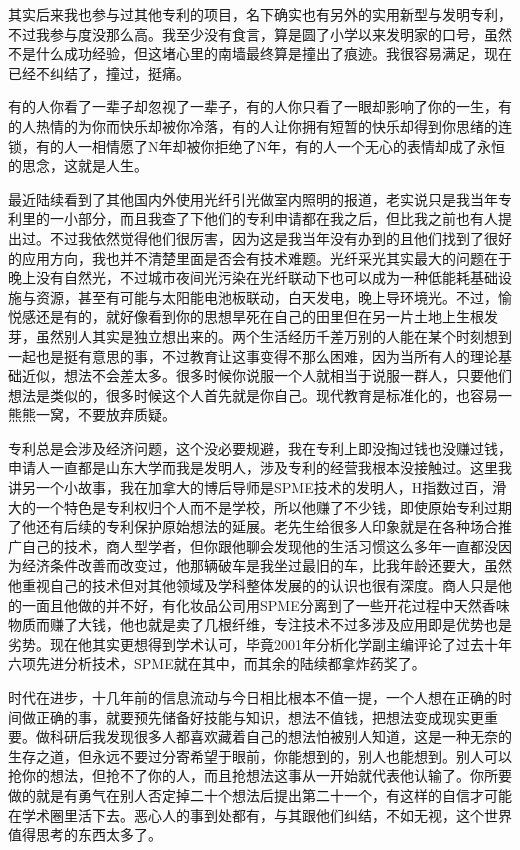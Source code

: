 \documentclass[
]{book}
\begin{document}
其实后来我也参与过其他专利的项目，名下确实也有另外的实用新型与发明专利，不过我参与度没那么高。我至少没有食言，算是圆了小学以来发明家的口号，虽然不是什么成功经验，但这堵心里的南墙最终算是撞出了痕迹。我很容易满足，现在已经不纠结了，撞过，挺痛。

有的人你看了一辈子却忽视了一辈子，有的人你只看了一眼却影响了你的一生，有的人热情的为你而快乐却被你冷落，有的人让你拥有短暂的快乐却得到你思绪的连锁，有的人一相情愿了N年却被你拒绝了N年，有的人一个无心的表情却成了永恒的思念，这就是人生。

最近陆续看到了其他国内外使用光纤引光做室内照明的报道，老实说只是我当年专利里的一小部分，而且我查了下他们的专利申请都在我之后，但比我之前也有人提出过。不过我依然觉得他们很厉害，因为这是我当年没有办到的且他们找到了很好的应用方向，我也并不清楚里面是否会有技术难题。光纤采光其实最大的问题在于晚上没有自然光，不过城市夜间光污染在光纤联动下也可以成为一种低能耗基础设施与资源，甚至有可能与太阳能电池板联动，白天发电，晚上导环境光。不过，愉悦感还是有的，就好像看到你的思想旱死在自己的田里但在另一片土地上生根发芽，虽然别人其实是独立想出来的。两个生活经历千差万别的人能在某个时刻想到一起也是挺有意思的事，不过教育让这事变得不那么困难，因为当所有人的理论基础近似，想法不会差太多。很多时候你说服一个人就相当于说服一群人，只要他们想法是类似的，很多时候这个人首先就是你自己。现代教育是标准化的，也容易一熊熊一窝，不要放弃质疑。

专利总是会涉及经济问题，这个没必要规避，我在专利上即没掏过钱也没赚过钱，申请人一直都是山东大学而我是发明人，涉及专利的经营我根本没接触过。这里我讲另一个小故事，我在加拿大的博后导师是SPME技术的发明人，H指数过百，滑大的一个特色是专利权归个人而不是学校，所以他赚了不少钱，即使原始专利过期了他还有后续的专利保护原始想法的延展。老先生给很多人印象就是在各种场合推广自己的技术，商人型学者，但你跟他聊会发现他的生活习惯这么多年一直都没因为经济条件改善而改变过，他那辆破车是我坐过最旧的车，比我年龄还要大，虽然他重视自己的技术但对其他领域及学科整体发展的的认识也很有深度。商人只是他的一面且他做的并不好，有化妆品公司用SPME分离到了一些开花过程中天然香味物质而赚了大钱，他也就是卖了几根纤维，专注技术不过多涉及应用即是优势也是劣势。现在他其实更想得到学术认可，毕竟2001年分析化学副主编评论了过去十年六项先进分析技术，SPME就在其中，而其余的陆续都拿炸药奖了。

时代在进步，十几年前的信息流动与今日相比根本不值一提，一个人想在正确的时间做正确的事，就要预先储备好技能与知识，想法不值钱，把想法变成现实更重要。做科研后我发现很多人都喜欢藏着自己的想法怕被别人知道，这是一种无奈的生存之道，但永远不要过分寄希望于眼前，你能想到的，别人也能想到。别人可以抢你的想法，但抢不了你的人，而且抢想法这事从一开始就代表他认输了。你所要做的就是有勇气在别人否定掉二十个想法后提出第二十一个，有这样的自信才可能在学术圈里活下去。恶心人的事到处都有，与其跟他们纠结，不如无视，这个世界值得思考的东西太多了。
\end{document}
